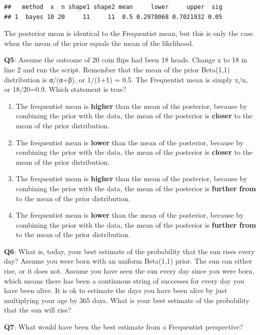 \documentclass[
  oneside]{krantz}
\providecommand{\tightlist}{%
  \setlength{\itemsep}{0pt}\setlength{\parskip}{0pt}}
\begin{document}
\begin{verbatim}
##   method  x  n shape1 shape2 mean     lower     upper  sig
## 1  bayes 10 20     11     11  0.5 0.2978068 0.7021932 0.05
\end{verbatim}

The posterior mean is identical to the Frequentist mean, but this is only the case when the mean of the prior equals the mean of the likelihood.

\textbf{Q5}: Assume the outcome of 20 coin flips had been 18 heads. Change x to 18 in line 2 and run the script. Remember that the mean of the prior Beta(1,1) distribution is α/(α+β), or 1/(1+1) = 0.5. The Frequentist mean is simply x/n, or 18/20=0.9. Which statement is true?

\begin{enumerate}
\def\labelenumi{\Alph{enumi})}
\tightlist
\item
  The frequentist mean is \textbf{higher} than the mean of the posterior, because by combining the prior with the data, the mean of the posterior is \textbf{closer} to the mean of the prior distribution.
\item
  The frequentist mean is \textbf{lower} than the mean of the posterior, because by combining the prior with the data, the mean of the posterior is \textbf{closer} to the mean of the prior distribution.
\item
  The frequentist mean is \textbf{higher} than the mean of the posterior, because by combining the prior with the data, the mean of the posterior is \textbf{further from} to the mean of the prior distribution.
\item
  The frequentist mean is \textbf{lower} than the mean of the posterior, because by combining the prior with the data, the mean of the posterior is \textbf{further from} to the mean of the prior distribution.
\end{enumerate}

\textbf{Q6}: What is, today, your best estimate of the probability that the sun rises every day? Assume you were born with an uniform Beta(1,1) prior. The sun can either rise, or it does not. Assume you have seen the sun every day since you were born, which means there has been a continuous string of successes for every day you have been alive. It is ok to estimate the days you have been alive by just multiplying your age by 365 days. What is your best estimate of the probability that the sun will rise?

\textbf{Q7}: What would have been the best estimate from a Frequentist perspective?
\end{document}
